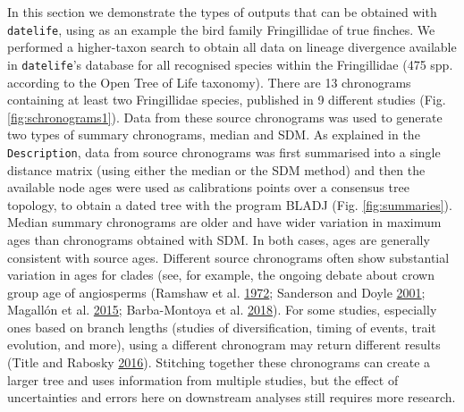 \documentclass[]{article}
\begin{document}
In this section we demonstrate the types of outputs that can be obtained with \texttt{datelife}, using as an example the bird family Fringillidae of true finches. We performed a higher-taxon search to obtain all data on lineage divergence available in \texttt{datelife}'s database for all recognised species within the Fringillidae (475 spp. according to the Open Tree of Life taxonomy). There are 13 chronograms containing at least two Fringillidae species, published in 9 different studies (Fig. \ref{fig:schronograms1}).
Data from these source chronograms was used to generate two types of summary chronograms, median and SDM. As explained in the \texttt{Description}, data from source chronograms was first summarised into a single distance matrix (using either the median or the SDM method) and then the available node ages were used as calibrations points over a consensus tree topology, to obtain a dated tree with the program BLADJ (Fig. \ref{fig:summaries}). Median summary chronograms are older and have wider variation in maximum ages than chronograms obtained with SDM. In both cases, ages are generally consistent with source ages.
Different source chronograms often show substantial variation in ages for clades (see, for example, the ongoing debate about crown group age of angiosperms (Ramshaw et al. \protect\hyperlink{ref-ramshaw1972time}{1972}; Sanderson and Doyle \protect\hyperlink{ref-sanderson2001sources}{2001}; Magallón et al. \protect\hyperlink{ref-magallon2015metacalibrated}{2015}; Barba-Montoya et al. \protect\hyperlink{ref-barba2018constraining}{2018}). For some studies, especially ones based on branch lengths (studies of diversification, timing of events, trait evolution, and more), using a different chronogram may return different results (Title and Rabosky \protect\hyperlink{ref-title2016macrophylogenies}{2016}). Stitching together these chronograms can create a larger tree and uses information from multiple studies, but the effect of uncertainties and errors here on downstream analyses still requires more research.
\end{document}
